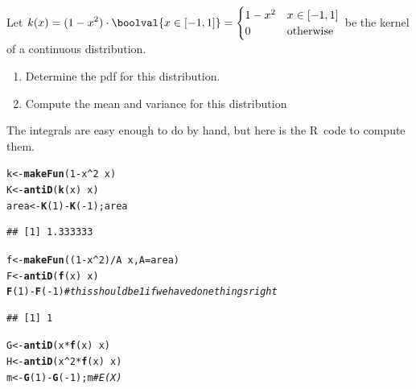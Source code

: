 \documentclass[twoside]{book}\usepackage[]{graphicx}\usepackage[]{xcolor}
\makeatletter
\newcommand{\hlnum}[1]{\textcolor[rgb]{0.686,0.059,0.569}{#1}}%
\newcommand{\hlcom}[1]{\textcolor[rgb]{0.678,0.584,0.686}{\textit{#1}}}%
\newcommand{\hlopt}[1]{\textcolor[rgb]{0,0,0}{#1}}%
\newcommand{\hlstd}[1]{\textcolor[rgb]{0.345,0.345,0.345}{#1}}%
\newcommand{\hlkwb}[1]{\textcolor[rgb]{0.69,0.353,0.396}{#1}}%
\newcommand{\hlkwc}[1]{\textcolor[rgb]{0.333,0.667,0.333}{#1}}%
\newcommand{\hlkwd}[1]{\textcolor[rgb]{0.737,0.353,0.396}{\textbf{#1}}}%
\newenvironment{kframe}{%
 \def\at@end@of@kframe{}%
 \ifinner\ifhmode%
  \def\at@end@of@kframe{\end{minipage}}%
  \begin{minipage}{\columnwidth}%
 \fi\fi%
 \def\FrameCommand##1{\hskip\@totalleftmargin \hskip-\fboxsep
 \colorbox{shadecolor}{##1}\hskip-\fboxsep
     \hskip-\linewidth \hskip-\@totalleftmargin \hskip\columnwidth}%
 \MakeFramed {\advance\hsize-\width
   \@totalleftmargin\z@ \linewidth\hsize
   \@setminipage}}%
 {\par\unskip\endMakeFramed%
 \at@end@of@kframe}
\newenvironment{knitrout}{}{} %
\def\R{{\sf R}}
\makeatother
\begin{document}
\begin{problem}
	Let $\displaystyle k(x) = (1 - x^2) \cdot \boolval{ x \in [-1,1] } = 
	\begin{cases}
		1-x^2 & x \in [-1,1] \\ 
		0 & \mbox{otherwise} 
	\end{cases}$ be the kernel of a continuous distribution.
	\begin{enumerate}
		\item
			Determine the pdf for this distribution.
		\item
			Compute the mean and variance for this distribution
	\end{enumerate}
\end{problem}

\begin{solution}
	The integrals are easy enough to do by hand, but here is the \R\ code 
	to compute them.
\begin{knitrout}
\color{fgcolor}\begin{kframe}
\begin{alltt}
\hlstd{k} \hlkwb{<-} \hlkwd{makeFun}\hlstd{(} \hlnum{1} \hlopt{-} \hlstd{x}\hlopt{^}\hlnum{2} \hlopt{~} \hlstd{x )}
\hlstd{K} \hlkwb{<-} \hlkwd{antiD}\hlstd{(} \hlkwd{k}\hlstd{(x)} \hlopt{~} \hlstd{x )}
\hlstd{area} \hlkwb{<-} \hlkwd{K}\hlstd{(}\hlnum{1}\hlstd{)} \hlopt{-} \hlkwd{K}\hlstd{(}\hlopt{-}\hlnum{1}\hlstd{); area}
\end{alltt}
\begin{verbatim}
## [1] 1.333333
\end{verbatim}
\begin{alltt}
\hlstd{f} \hlkwb{<-} \hlkwd{makeFun}\hlstd{( (}\hlnum{1} \hlopt{-} \hlstd{x}\hlopt{^}\hlnum{2}\hlstd{)}\hlopt{/}\hlstd{A} \hlopt{~} \hlstd{x,} \hlkwc{A}\hlstd{=area )}
\hlstd{F} \hlkwb{<-} \hlkwd{antiD}\hlstd{(}\hlkwd{f}\hlstd{(x)} \hlopt{~} \hlstd{x)}
\hlkwd{F}\hlstd{(}\hlnum{1}\hlstd{)} \hlopt{-} \hlkwd{F}\hlstd{(}\hlopt{-}\hlnum{1}\hlstd{)}    \hlcom{# this should be 1 if we have done things right}
\end{alltt}
\begin{verbatim}
## [1] 1
\end{verbatim}
\begin{alltt}
\hlstd{G} \hlkwb{<-} \hlkwd{antiD}\hlstd{( x} \hlopt{*} \hlkwd{f}\hlstd{(x)} \hlopt{~} \hlstd{x )}
\hlstd{H} \hlkwb{<-} \hlkwd{antiD}\hlstd{( x}\hlopt{^}\hlnum{2} \hlopt{*} \hlkwd{f}\hlstd{(x)} \hlopt{~} \hlstd{x )}
\hlstd{m} \hlkwb{<-} \hlkwd{G}\hlstd{(}\hlnum{1}\hlstd{)} \hlopt{-} \hlkwd{G}\hlstd{(}\hlopt{-}\hlnum{1}\hlstd{); m}               \hlcom{# E(X)}

\end{alltt}
\end{kframe}
\end{knitrout}
\end{solution}
\end{document}
